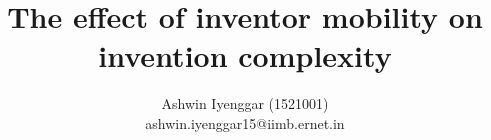 \documentclass[12pt]{article}
\begin{document}
\title{The effect of inventor mobility on  invention complexity}
\author{Ashwin Iyenggar  (1521001) \\ ashwin.iyenggar15@iimb.ernet.in} 

\maketitle
\thispagestyle{empty}


\newpage


\begin{landscape}

\end{landscape}


\newpage

\newpage


\newpage


\newpage


\newpage


\begin{comment}
\begin{table}
\caption{Regression Results}

\end{table}
\end{comment}

 

\end{document}
